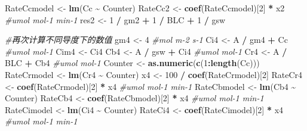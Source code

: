 \documentclass[
]{krantz}
\makeatletter
\newenvironment{Shaded}{\begin{snugshade}}{\end{snugshade}}
\newcommand{\CommentTok}[1]{\textcolor[rgb]{0.56,0.35,0.01}{\textit{#1}}}
\newcommand{\DecValTok}[1]{\textcolor[rgb]{0.00,0.00,0.81}{#1}}
\newcommand{\KeywordTok}[1]{\textcolor[rgb]{0.13,0.29,0.53}{\textbf{#1}}}
\newcommand{\NormalTok}[1]{#1}
\newcommand{\OperatorTok}[1]{\textcolor[rgb]{0.81,0.36,0.00}{\textbf{#1}}}
\newcommand{\StringTok}[1]{\textcolor[rgb]{0.31,0.60,0.02}{#1}}
\newenvironment{kframe}{%
\medskip{}
\setlength{\fboxsep}{.8em}
 \def\at@end@of@kframe{}%
 \ifinner\ifhmode%
  \def\at@end@of@kframe{\end{minipage}}%
  \begin{minipage}{\columnwidth}%
 \fi\fi%
 \def\FrameCommand##1{\hskip\@totalleftmargin \hskip-\fboxsep
 \colorbox{shadecolor}{##1}\hskip-\fboxsep
     \hskip-\linewidth \hskip-\@totalleftmargin \hskip\columnwidth}%
 \MakeFramed {\advance\hsize-\width
   \@totalleftmargin\z@ \linewidth\hsize
   \@setminipage}}%
 {\par\unskip\endMakeFramed%
 \at@end@of@kframe}
\renewenvironment{Shaded}{\begin{kframe}}{\end{kframe}}
\makeatother
\begin{document}
\begin{Shaded}
\begin{Highlighting}[]
\NormalTok{RateCcmodel \textless{}{-}}\StringTok{ }\KeywordTok{lm}\NormalTok{(Cc }\OperatorTok{\textasciitilde{}}\StringTok{ }\NormalTok{Counter)}
\NormalTok{RateCc2 \textless{}{-}}\StringTok{ }\KeywordTok{coef}\NormalTok{(RateCcmodel)[}\DecValTok{2}\NormalTok{] }\OperatorTok{*}\StringTok{ }\NormalTok{x2 }\CommentTok{\#umol mol{-}1 min{-}1}
\NormalTok{res2 \textless{}{-}}\StringTok{ }\DecValTok{1} \OperatorTok{/}\StringTok{ }\NormalTok{gm2 }\OperatorTok{+}\StringTok{ }\DecValTok{1} \OperatorTok{/}\StringTok{ }\NormalTok{BLC }\OperatorTok{+}\StringTok{ }\DecValTok{1} \OperatorTok{/}\StringTok{ }\NormalTok{gsw}

\CommentTok{\#再次计算不同导度下的数值}
\NormalTok{gm4 \textless{}{-}}\StringTok{ }\DecValTok{4} \CommentTok{\#mol m{-}2 s{-}1}
\NormalTok{Ci4 \textless{}{-}}\StringTok{ }\NormalTok{A }\OperatorTok{/}\StringTok{ }\NormalTok{gm4 }\OperatorTok{+}\StringTok{ }\NormalTok{Cc }\CommentTok{\#umol mol{-}1}
\NormalTok{Cim4 \textless{}{-}}\StringTok{ }\NormalTok{Ci4}
\NormalTok{Cb4 \textless{}{-}}\StringTok{ }\NormalTok{A }\OperatorTok{/}\StringTok{ }\NormalTok{gsw }\OperatorTok{+}\StringTok{ }\NormalTok{Ci4 }\CommentTok{\#umol mol{-}1}
\NormalTok{Cr4 \textless{}{-}}\StringTok{ }\NormalTok{A }\OperatorTok{/}\StringTok{ }\NormalTok{BLC }\OperatorTok{+}\StringTok{ }\NormalTok{Cb4 }\CommentTok{\#umol mol{-}1}
\NormalTok{Counter \textless{}{-}}\StringTok{ }\KeywordTok{as.numeric}\NormalTok{(}\KeywordTok{c}\NormalTok{(}\DecValTok{1}\OperatorTok{:}\KeywordTok{length}\NormalTok{(Cc)))}
\NormalTok{RateCrmodel \textless{}{-}}\StringTok{ }\KeywordTok{lm}\NormalTok{(Cr4 }\OperatorTok{\textasciitilde{}}\StringTok{ }\NormalTok{Counter)}
\NormalTok{x4 \textless{}{-}}\StringTok{ }\DecValTok{100} \OperatorTok{/}\StringTok{ }\KeywordTok{coef}\NormalTok{(RateCrmodel)[}\DecValTok{2}\NormalTok{]}
\NormalTok{RateCr4 \textless{}{-}}\StringTok{ }\KeywordTok{coef}\NormalTok{(RateCrmodel)[}\DecValTok{2}\NormalTok{] }\OperatorTok{*}\StringTok{ }\NormalTok{x4 }\CommentTok{\#umol mol{-}1 min{-}1}
\NormalTok{RateCbmodel \textless{}{-}}\StringTok{ }\KeywordTok{lm}\NormalTok{(Cb4 }\OperatorTok{\textasciitilde{}}\StringTok{ }\NormalTok{Counter)}
\NormalTok{RateCb4 \textless{}{-}}\StringTok{ }\KeywordTok{coef}\NormalTok{(RateCbmodel)[}\DecValTok{2}\NormalTok{] }\OperatorTok{*}\StringTok{ }\NormalTok{x4 }\CommentTok{\#umol mol{-}1 min{-}1}
\NormalTok{RateCimodel \textless{}{-}}\StringTok{ }\KeywordTok{lm}\NormalTok{(Ci4 }\OperatorTok{\textasciitilde{}}\StringTok{ }\NormalTok{Counter)}
\NormalTok{RateCi4 \textless{}{-}}\StringTok{ }\KeywordTok{coef}\NormalTok{(RateCimodel)[}\DecValTok{2}\NormalTok{] }\OperatorTok{*}\StringTok{ }\NormalTok{x4 }\CommentTok{\#umol mol{-}1 min{-}1}

\end{Highlighting}
\end{Shaded}
\end{document}
